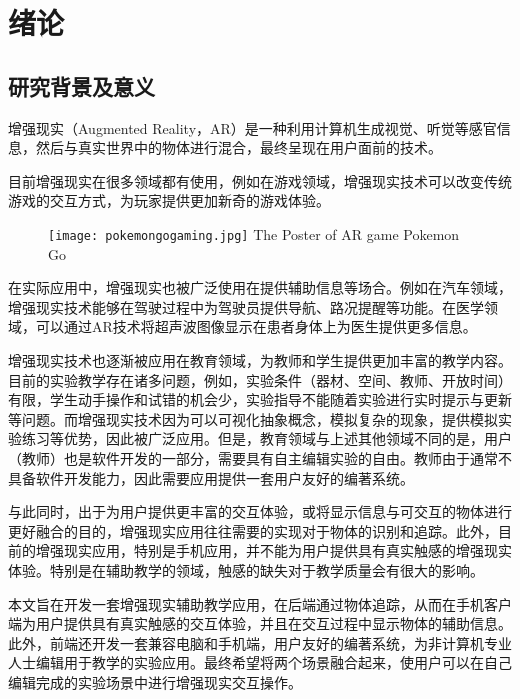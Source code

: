 \chapter{绪论}
\label{chap:myIntro}

\section{研究背景及意义}
\label{sec:background}
增强现实（Augmented Reality，AR）是一种利用计算机生成视觉、听觉等感官信息，然后与真实世界中的物体进行混合，最终呈现在用户面前的技术。\cite{ARconception}

目前增强现实在很多领域都有使用，例如在游戏领域，增强现实技术可以改变传统游戏的交互方式，为玩家提供更加新奇的游戏体验。
    
\begin{figure}[!htp]
  \centering
  \texttt{[image: pokemongogaming.jpg]}
    {The Poster of AR game Pokemon Go}
 \label{fig:longcaptionbad}
\end{figure}

在实际应用中，增强现实也被广泛使用在提供辅助信息等场合。例如在汽车领域，增强现实技术能够在驾驶过程中为驾驶员提供导航、路况提醒等功能。\cite{ARdriving}在医学领域，可以通过AR技术将超声波图像显示在患者身体上为医生提供更多信息。\cite{billinghurst2002augmented}

增强现实技术也逐渐被应用在教育领域，为教师和学生提供更加丰富的教学内容。目前的实验教学存在诸多问题，例如，实验条件（器材、空间、教师、开放时间）有限，学生动手操作和试错的机会少，实验指导不能随着实验进行实时提示与更新等问题。而增强现实技术因为可以可视化抽象概念，模拟复杂的现象，提供模拟实验练习等优势，因此被广泛应用。\cite{wu2013current}但是，教育领域与上述其他领域不同的是，用户（教师）也是软件开发的一部分，需要具有自主编辑实验的自由。教师由于通常不具备软件开发能力，因此需要应用提供一套用户友好的编著系统。

与此同时，出于为用户提供更丰富的交互体验，或将显示信息与可交互的物体进行更好融合的目的，增强现实应用往往需要的实现对于物体的识别和追踪。此外，目前的增强现实应用，特别是手机应用，并不能为用户提供具有真实触感的增强现实体验。特别是在辅助教学的领域，触感的缺失对于教学质量会有很大的影响。

本文旨在开发一套增强现实辅助教学应用，在后端通过物体追踪，从而在手机客户端为用户提供具有真实触感的交互体验，并且在交互过程中显示物体的辅助信息。此外，前端还开发一套兼容电脑和手机端，用户友好的编著系统，为非计算机专业人士编辑用于教学的实验应用。最终希望将两个场景融合起来，使用户可以在自己编辑完成的实验场景中进行增强现实交互操作。

